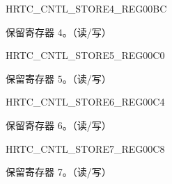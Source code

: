 \begin{register}{H}{RTC\_CNTL\_STORE4\_REG}{\hexprefix{}00BC}\label{regdesc:RTCCNTLSTORE4REG}
%
\regnewline%
\begin{regdesc}\begin{reglist}
\label{fielddesc:RTCCNTLRTCSCRATCH4}\item [RTC\_CNTL\_RTC\_SCRATCH4] 保留寄存器 4。（读/写）
\end{reglist}\end{regdesc}
\end{register}


\begin{register}{H}{RTC\_CNTL\_STORE5\_REG}{\hexprefix{}00C0}\label{regdesc:RTCCNTLSTORE5REG}
%
\regnewline%
\begin{regdesc}\begin{reglist}
\label{fielddesc:RTCCNTLRTCSCRATCH5}\item [RTC\_CNTL\_RTC\_SCRATCH5] 保留寄存器 5。（读/写）
\end{reglist}\end{regdesc}
\end{register}


\begin{register}{H}{RTC\_CNTL\_STORE6\_REG}{\hexprefix{}00C4}\label{regdesc:RTCCNTLSTORE6REG}
%
\regnewline%
\begin{regdesc}\begin{reglist}
\label{fielddesc:RTCCNTLRTCSCRATCH6}\item [RTC\_CNTL\_RTC\_SCRATCH6] 保留寄存器 6。（读/写）
\end{reglist}\end{regdesc}
\end{register}


\begin{register}{H}{RTC\_CNTL\_STORE7\_REG}{\hexprefix{}00C8}\label{regdesc:RTCCNTLSTORE7REG}
%
\regnewline%
\begin{regdesc}\begin{reglist}
\label{fielddesc:RTCCNTLRTCSCRATCH7}\item [RTC\_CNTL\_RTC\_SCRATCH7] 保留寄存器 7。（读/写）
\end{reglist}\end{regdesc}
\end{register}


